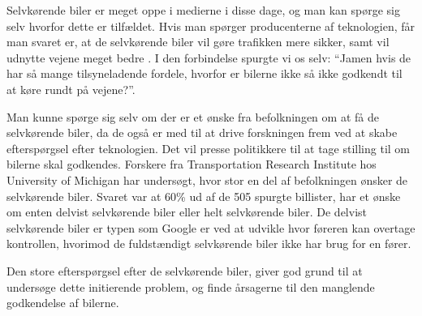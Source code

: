 Selvkørende biler er meget oppe i medierne i disse dage, og man kan spørge sig selv hvorfor dette er tilfældet. Hvis man spørger producenterne af teknologien, får man svaret er, at de selvkørende biler vil gøre trafikken mere sikker, samt vil udnytte vejene meget bedre \cite{GOOG_SITE}. I den forbindelse spurgte vi os selv: ``Jamen hvis de har så mange tilsyneladende fordele, hvorfor er bilerne ikke så ikke godkendt til at køre rundt på vejene?''. 

Man kunne spørge sig selv om der er et ønske fra befolkningen om at få de selvkørende biler, da de også er med til at drive forskningen frem ved at skabe efterspørgsel efter teknologien. Det vil presse politikkere til at tage stilling til om bilerne skal godkendes. Forskere fra Transportation Research Institute hos University of Michigan har undersøgt, hvor stor en del af befolkningen ønsker de selvkørende biler\cite{UMTRI}. Svaret var at 60\% ud af de 505 spurgte billister, har et ønske om enten delvist selvkørende biler eller helt selvkørende biler. De delvist selvkørende biler er typen som Google er ved at udvikle hvor føreren kan overtage kontrollen, hvorimod de fuldstændigt selvkørende biler ikke har brug for en fører.

Den store efterspørgsel efter de selvkørende biler, giver god grund til at undersøge dette initierende problem, og finde årsagerne til den manglende godkendelse af bilerne.